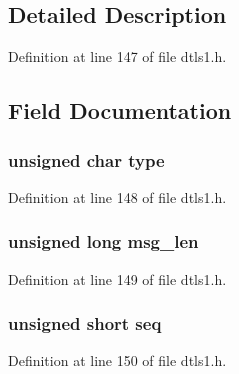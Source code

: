 \subsection{Detailed Description}


Definition at line 147 of file dtls1.\+h.



\subsection{Field Documentation}
\subsubsection[{\texorpdfstring{type}{type}}]{\setlength{\rightskip}{0pt plus 5cm}unsigned char type}\hypertarget{structhm__header__st_aa5044999f3339d2ba3b1bf22fa6cfe95}{}\label{structhm__header__st_aa5044999f3339d2ba3b1bf22fa6cfe95}


Definition at line 148 of file dtls1.\+h.

\subsubsection[{\texorpdfstring{msg\+\_\+len}{msg_len}}]{\setlength{\rightskip}{0pt plus 5cm}unsigned long msg\+\_\+len}\hypertarget{structhm__header__st_abd98ba3fe3e5ad463d3614def95f64c9}{}\label{structhm__header__st_abd98ba3fe3e5ad463d3614def95f64c9}


Definition at line 149 of file dtls1.\+h.

\subsubsection[{\texorpdfstring{seq}{seq}}]{\setlength{\rightskip}{0pt plus 5cm}unsigned short seq}\hypertarget{structhm__header__st_ae3912cd83da227c65c49a73665d30e15}{}\label{structhm__header__st_ae3912cd83da227c65c49a73665d30e15}


Definition at line 150 of file dtls1.\+h.

